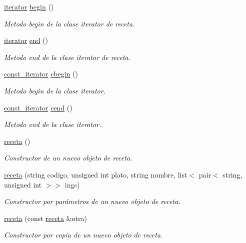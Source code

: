 \begin{DoxyCompactItemize}
\item 
\hyperlink{classreceta_1_1iterator}{iterator} \hyperlink{classreceta_a625bfcff90bc88689c85f65d36e5e8e6}{begin} ()
\begin{DoxyCompactList}\small\item\em Metodo begin de la clase iterator de receta. \end{DoxyCompactList}\item 
\hyperlink{classreceta_1_1iterator}{iterator} \hyperlink{classreceta_ac19cd88e0a062f983baa0cc5c4bfca3c}{end} ()
\begin{DoxyCompactList}\small\item\em Metodo end de la clase iterator de receta. \end{DoxyCompactList}\item 
\hyperlink{classreceta_1_1const__iterator}{const\+\_\+iterator} \hyperlink{classreceta_a0f9d5839b4e8ef5f54bb3971e556d16e}{cbegin} ()
\begin{DoxyCompactList}\small\item\em Metodo begin de la clase iterator. \end{DoxyCompactList}\item 
\hyperlink{classreceta_1_1const__iterator}{const\+\_\+iterator} \hyperlink{classreceta_ad35b2055dedaa4bef8373d276f9fef77}{cend} ()
\begin{DoxyCompactList}\small\item\em Metodo end de la clase iterator. \end{DoxyCompactList}\item 
\hyperlink{classreceta_ab103b4d892eaced39989fe3d705ca303}{receta} ()
\begin{DoxyCompactList}\small\item\em Constructor de un nuevo objeto de receta. \end{DoxyCompactList}\item 
\hyperlink{classreceta_aaa59345070162d628906101d8cd42ed2}{receta} (string codigo, unsigned int plato, string nombre, list$<$ pair$<$ string, unsigned int $>$$>$ ings)
\begin{DoxyCompactList}\small\item\em Constructor por parámetros de un nuevo objeto de receta. \end{DoxyCompactList}\item 
\hyperlink{classreceta_ac638aed5764e8f69f38bd543880373fb}{receta} (const \hyperlink{classreceta}{receta} \&otra)
\begin{DoxyCompactList}\small\item\em Constructor por copia de un nuevo objeto de receta. \end{DoxyCompactList}\item 
$$
\end{DoxyCompactItemize}
